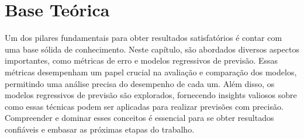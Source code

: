 \section{Base Te\'orica}\label{sec:base}

Um dos pilares fundamentais para obter resultados satisfatórios é contar com uma base sólida de conhecimento. Neste capítulo, são abordados diversos aspectos importantes, como métricas de erro e modelos regressivos de previsão. Essas métricas desempenham um papel crucial na avaliação e comparação dos modelos, permitindo uma análise precisa do desempenho de cada um. Além disso, os modelos regressivos de previsão são explorados, fornecendo insights valiosos sobre como essas técnicas podem ser aplicadas para realizar previsões com precisão. Compreender e dominar esses conceitos é essencial para se obter resultados confiáveis e embasar as próximas etapas do trabalho.









